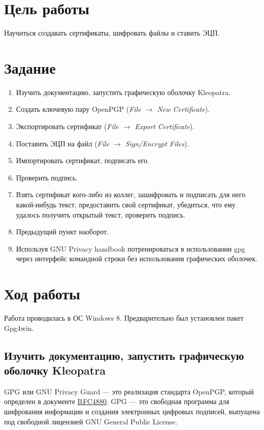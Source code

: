 \documentclass[10pt,a4paper,titlepage]{article}
\begin{document}
\tableofcontents
\newpage

\section{Цель работы}
Научиться создавать сертификаты, шифровать файлы и ставить ЭЦП.

\section{Задание}
\begin{enumerate}
\item Изучить документацию, запустить графическую оболочку Kleopatra.
\item Создать ключевую пару OpenPGP (\textit{File $\rightarrow$ New Certificate}).
\item Экспортировать сертификат (\textit{File $\rightarrow$ Export Certificate}).
\item Поставить ЭЦП на файл (\textit{File $\rightarrow$ Sign/Encrypt Files}).
\item Импортировать сертификат, подписать его.
\item Проверить подпись.
\item Взять сертификат кого-либо из коллег, зашифровать и подписать для него какой-нибудь текст, предоставить свой сертификат, убедиться, что ему удалось получить открытый текст, проверить подпись.
\item Предыдущий пункт наоборот.
\item Используя GNU Privacy handbook потренироваться в использовании gpg через интерфейс командной строки без использования графических оболочек.
\end{enumerate}

\section{Ход работы}
Работа проводилась в ОС Windows 8. Предварительно был установлен пакет Gpg4win.

\subsection{Изучить документацию, запустить графическую оболочку Kleopatra}
GPG или GNU Privacy Guard --- это реализация стандарта OpenPGP, который определен в документе \href{http://www.ietf.org/rfc/rfc4880.txt}{RFC4880}. GPG --- это свободная программа для шифрования информации и создания электронных цифровых подписей, выпущена под свободной лицензией GNU General Public License.
\end{document}
